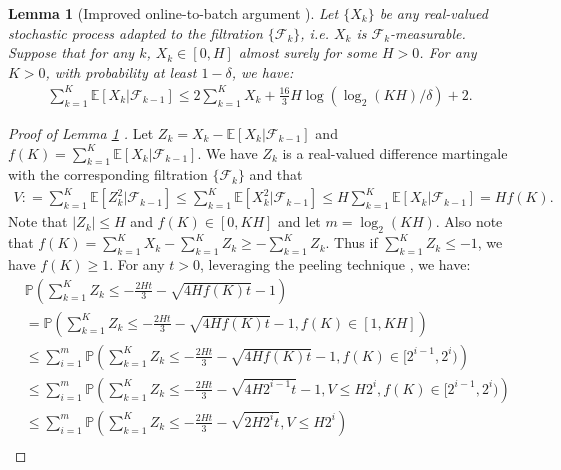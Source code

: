 \documentclass{article} \usepackage{iclr2023/iclr2023_conference,times}
\newtheorem{lemma}{Lemma}[section]
\begin{document}
\begin{lemma}[Improved online-to-batch argument \cite{nguyen2022instance}]
Let $\{X_k\}$ be any real-valued stochastic process adapted to the filtration $\{\mathcal{F}_k\}$, i.e. $X_k$ is $\mathcal{F}_k$-measurable. Suppose that for any $k$, $X_k \in [0,H]$ almost surely for some $H > 0$. For any $K > 0$, with probability at least $1 - \delta$, we have:
\begin{align*}
    \sum_{k=1}^K \mathbb{E} \left[ X_k | \mathcal{F}_{k-1} \right] \leq 2 \sum_{k=1}^K X_k + \frac{16}{3} H \log(\log_2(KH)/\delta) + 2 . 
\end{align*}
\label{lemma:improved_online_to_batch}
\end{lemma}
\begin{proof}[Proof of Lemma \ref{lemma:improved_online_to_batch} ]
Let $Z_k = X_k - \mathbb{E} \left[ X_k | \mathcal{F}_{k-1} \right]$ and $f(K) = \sum_{k=1}^K \mathbb{E} \left[ X_k | \mathcal{F}_{k-1} \right]$. We have $Z_k$ is a real-valued difference martingale with the corresponding filtration $\{\mathcal{F}_k\}$ and that
\begin{align*}
    V: = \sum_{k=1}^K \mathbb{E} \left[ Z_k^2 | \mathcal{F}_{k-1} \right] \leq \sum_{k=1}^K \mathbb{E} \left[ X_k^2 | \mathcal{F}_{k-1} \right] \leq H \sum_{k=1}^K \mathbb{E} \left[ X_k | \mathcal{F}_{k-1} \right]
    = H f(K). 
\end{align*}
Note that $|Z_k| \leq H$  and $f(K) \in [0, KH]$ and let $m = \log_2(KH)$.
Also note that $f(K) = \sum_{k=1}^K X_k - \sum_{k=1}^K Z_k \geq - \sum_{k=1}^K Z_k$. Thus if $\sum_{k=1}^K Z_k \leq -1$, we have $f(K) \geq 1$. For any $t > 0$, leveraging the peeling technique \citep{bartlett2005local}, we have:
\begin{align*}
    &\mathbb{P} \left( \sum_{k=1}^K Z_k \leq -\frac{2 H t}{3} - \sqrt{ 4 H f(K) t } - 1 \right) \\
    &= \mathbb{P} \left( \sum_{k=1}^K Z_k \leq -\frac{2 H t}{3} - \sqrt{ 4 H f(K) t  } - 1, f(K) \in [1, KH]\right) \\ 
    &\leq \sum_{i=1}^m \mathbb{P} \left( \sum_{k=1}^K Z_k \leq -\frac{ 2 H t}{3} - \sqrt{ 4 H f(K) t } - 1, f(K) \in [2^{i-1}, 2^i)\right) \\ 
    &\leq \sum_{i=1}^m \mathbb{P} \left( \sum_{k=1}^K Z_k \leq -\frac{2 H t}{3} - \sqrt{ 4 H 2^{i-1} t } - 1, V \leq H 2^i, f(K) \in [2^{i-1}, 2^i)\right) \\ 
    &\leq \sum_{i=1}^m \mathbb{P} \left( \sum_{k=1}^K Z_k \leq -\frac{2 H t}{3} - \sqrt{ 2 H 2^i t }, V \leq H 2^i \right) \\ 

\end{align*}
\end{proof}
\end{document}

